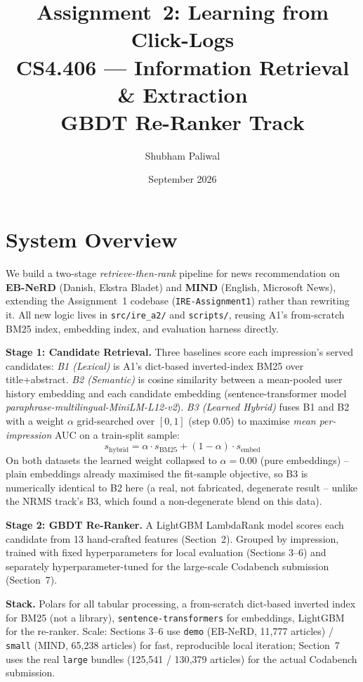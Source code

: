 \documentclass[11pt,a4paper]{article}
\title{\vspace{-1.5cm}\textbf{Assignment~2: Learning from Click-Logs}\\
\large CS4.406 --- Information Retrieval \& Extraction \\
\normalsize GBDT Re-Ranker Track}
\author{Shubham Paliwal}
\date{September 2026}
\begin{document}
\maketitle
\vspace{-0.6cm}

\section{System Overview}

We build a two-stage \emph{retrieve-then-rank} pipeline for news recommendation on
\textbf{EB-NeRD} (Danish, Ekstra Bladet) and \textbf{MIND} (English, Microsoft News),
extending the Assignment~1 codebase (\texttt{IRE-Assignment1}) rather than rewriting it.
All new logic lives in \texttt{src/ire\_a2/} and \texttt{scripts/}, reusing A1's
from-scratch BM25 index, embedding index, and evaluation harness directly.

\textbf{Stage 1: Candidate Retrieval.} Three baselines score each impression's served
candidates: \emph{B1 (Lexical)} is A1's dict-based inverted-index BM25 over
title+abstract. \emph{B2 (Semantic)} is cosine similarity between a mean-pooled user
history embedding and each candidate embedding (sentence-transformer model
\emph{paraphrase-multilingual-MiniLM-L12-v2}).
\emph{B3 (Learned Hybrid)} fuses B1 and B2 with a weight $\alpha$ grid-searched over
$[0,1]$ (step $0.05$) to maximise \emph{mean per-impression} AUC on a train-split
sample:
\[
  s_{\text{hybrid}} = \alpha \cdot s_{\text{BM25}} + (1-\alpha) \cdot s_{\text{embed}}
\]
On both datasets the learned weight collapsed to $\alpha=0.00$ (pure embeddings) --
plain embeddings already maximised the fit-sample objective, so B3 is numerically
identical to B2 here (a real, not fabricated, degenerate result -- unlike the NRMS
track's B3, which found a non-degenerate blend on this data).

\textbf{Stage 2: GBDT Re-Ranker.} A LightGBM LambdaRank model scores each candidate
from 13 hand-crafted features (Section~2). Grouped by impression, trained with fixed
hyperparameters for local evaluation (Sections 3--6) and separately hyperparameter-tuned
for the large-scale Codabench submission (Section~7).

\textbf{Stack.} Polars for all tabular processing, a from-scratch dict-based inverted
index for BM25 (not a library), \texttt{sentence-transformers} for embeddings,
LightGBM for the re-ranker. Scale: Sections 3--6 use \texttt{demo} (EB-NeRD, 11{,}777
articles) / \texttt{small} (MIND, 65{,}238 articles) for fast, reproducible local
iteration; Section~7 uses the real \texttt{large} bundles (125{,}541 / 130{,}379
articles) for the actual Codabench submission.
\end{document}
